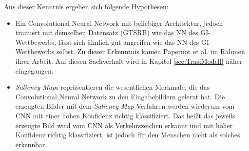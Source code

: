 Aus dieser Kenntnis ergeben sich folgende Hypothesen:
\begin{itemize}
	\item Ein Convolutional Neural Network mit beliebiger Architektur, jedoch trainiert mit demselben Datensatz (\ac{GTSRB}) wie das \ac{NN} des \ac{GI}-Wettbewerbs, lässt sich ähnlich gut angreifen wie das \ac{NN} des \ac{GI}-Wettbewerbs selbst. Zu dieser Erkenntnis kamen Papernot et al. \cite{papernot_+_2016} im Rahmen ihrer Arbeit. Auf diesen Sachverhalt wird in Kapitel \ref{sec:TrasiModell} näher eingegangen.
	\item 	\textit{Saliency Map}s repräsentieren die wesentlichen Merkmale, die das Convolutional Neural Network zu den Eingabebildern gelernt hat. Die erzeugten Bilder mit dem \textit{Saliency Map} Verfahren werden wiederum vom \ac{CNN} mit einer hohen Konfidenz richtig klassifiziert. Das heißt das jeweils erzeugte Bild wird vom \ac{CNN} als Verkehrszeichen erkannt und mit hoher Konfidenz richtig klassifiziert, ist jedoch für den Menschen nicht als solches erkennbar.
\end{itemize}

%
%
%
%


